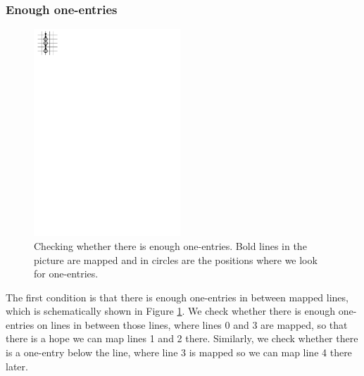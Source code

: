 \subsubsection{Enough one-entries}
\begin{figure}[h!]
\centering
\includegraphics[width=55mm]{../img/enough_one-entries.pdf}
\caption{Checking whether there is enough one-entries. Bold lines in the picture are mapped and in circles are the positions where we look for one-entries.}
\label{enough}
\end{figure}
The first condition is that there is enough one-entries in between mapped lines, which is schematically shown in Figure \ref{enough}. We check whether there is enough one-entries on lines in between those lines, where lines 0 and 3 are mapped, so that there is a hope we can map lines 1 and 2 there. Similarly, we check whether there is a one-entry below the line, where line 3 is mapped so we can map line 4 there later.
